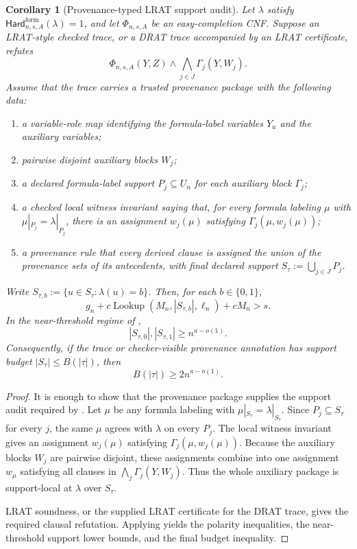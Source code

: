 \documentclass[11pt]{article}
\newtheorem{corollary}[theorem]{Corollary}
\theoremstyle{definition}
\newcommand{\bits}{\{0,1\}}
\newcommand{\Lookup}{\operatorname{Lookup}}
\newcommand{\HardF}{\mathsf{Hard}^{\mathrm{form}}}
\begin{document}
\begin{corollary}[Provenance-typed LRAT support audit]\label{cor:provenance-typed-lrat}
Let \(\lambda\) satisfy \(\HardF_{n,s,A}(\lambda)=1\), and let \(\Phi_{n,s,A}\) be an easy-completion CNF.  Suppose an LRAT-style checked trace, or a DRAT trace accompanied by an LRAT certificate, refutes
\[
  \Phi_{n,s,A}(Y,Z)\wedge\bigwedge_{j\in J}\Gamma_j(Y,W_j).
\]
Assume that the trace carries a trusted provenance package with the following data:
\begin{enumerate}
  \item a variable-role map identifying the formula-label variables \(Y_u\) and the auxiliary variables;
  \item pairwise disjoint auxiliary blocks \(W_j\);
  \item a declared formula-label support \(P_j\subseteq U_n\) for each auxiliary block \(\Gamma_j\);
  \item a checked local witness invariant saying that, for every formula labeling \(\mu\) with \(\mu|_{P_j}=\lambda|_{P_j}\), there is an assignment \(w_j(\mu)\) satisfying \(\Gamma_j(\mu,w_j(\mu))\);
  \item a provenance rule that every derived clause is assigned the union of the provenance sets of its antecedents, with final declared support \(S_\tau:=\bigcup_{j\in J}P_j\).
\end{enumerate}
Write \(S_{\tau,b}:=\{u\in S_\tau:\lambda(u)=b\}\).  Then, for each \(b\in\bits\),
\[
  g_n+c\Lookup(M_n,|S_{\tau,b}|,\ell_n)+cM_n>s.
\]
In the near-threshold regime of ,
\[
  |S_{\tau,0}|,|S_{\tau,1}|\ge n^{a-o(1)}.
\]
Consequently, if the trace or checker-visible provenance annotation has support budget \(|S_\tau|\le B(|\tau|)\), then
\[
  B(|\tau|)\ge 2n^{a-o(1)}.
\]
\end{corollary}

\begin{proof}
It is enough to show that the provenance package supplies the support audit required by .  Let \(\mu\) be any formula labeling with \(\mu|_{S_\tau}=\lambda|_{S_\tau}\).  Since \(P_j\subseteq S_\tau\) for every \(j\), the same \(\mu\) agrees with \(\lambda\) on every \(P_j\).  The local witness invariant gives an assignment \(w_j(\mu)\) satisfying \(\Gamma_j(\mu,w_j(\mu))\).  Because the auxiliary blocks \(W_j\) are pairwise disjoint, these assignments combine into one assignment \(w_\mu\) satisfying all clauses in \(\bigwedge_j\Gamma_j(Y,W_j)\).  Thus the whole auxiliary package is support-local at \(\lambda\) over \(S_\tau\).

LRAT soundness, or the supplied LRAT certificate for the DRAT trace, gives the required clausal refutation.  Applying  yields the polarity inequalities, the near-threshold support lower bounds, and the final budget inequality.
\end{proof}
\end{document}
